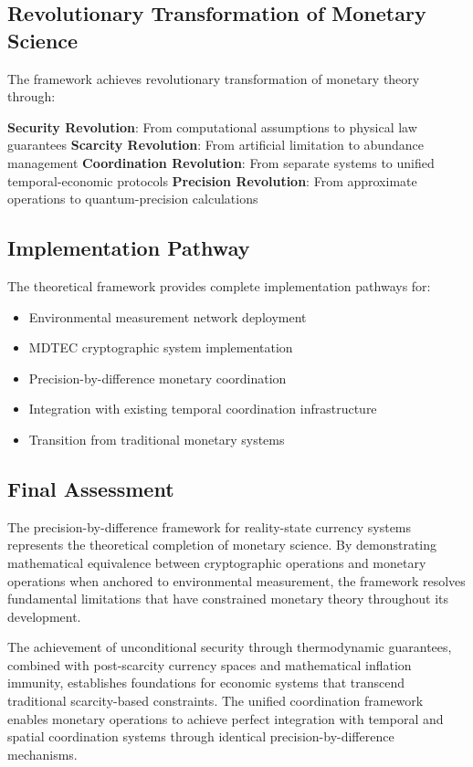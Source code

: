 \documentclass[12pt,a4paper]{article}
\begin{document}
\subsection{Revolutionary Transformation of Monetary Science}

The framework achieves revolutionary transformation of monetary theory through:

\textbf{Security Revolution}: From computational assumptions to physical law guarantees
\textbf{Scarcity Revolution}: From artificial limitation to abundance management  
\textbf{Coordination Revolution}: From separate systems to unified temporal-economic protocols
\textbf{Precision Revolution}: From approximate operations to quantum-precision calculations

\subsection{Implementation Pathway}

The theoretical framework provides complete implementation pathways for:
\begin{itemize}
\item Environmental measurement network deployment
\item MDTEC cryptographic system implementation
\item Precision-by-difference monetary coordination
\item Integration with existing temporal coordination infrastructure
\item Transition from traditional monetary systems
\end{itemize}

\subsection{Final Assessment}

The precision-by-difference framework for reality-state currency systems represents the theoretical completion of monetary science. By demonstrating mathematical equivalence between cryptographic operations and monetary operations when anchored to environmental measurement, the framework resolves fundamental limitations that have constrained monetary theory throughout its development.

The achievement of unconditional security through thermodynamic guarantees, combined with post-scarcity currency spaces and mathematical inflation immunity, establishes foundations for economic systems that transcend traditional scarcity-based constraints. The unified coordination framework enables monetary operations to achieve perfect integration with temporal and spatial coordination systems through identical precision-by-difference mechanisms.
\end{document}
